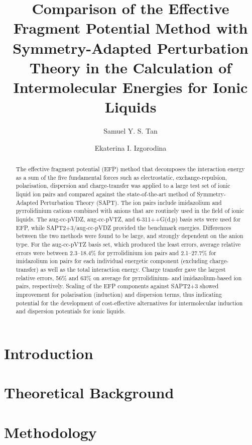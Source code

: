 \documentclass[journal=jctcce]{achemso}
\title{Comparison of the Effective Fragment Potential Method with Symmetry-Adapted Perturbation Theory in the Calculation of Intermolecular Energies for Ionic Liquids}
\author{Samuel Y. S. Tan}
\author{Ekaterina I. Izgorodina}
\affiliation[Monash University]
    {School of Chemistry, Monash University, 17 Rainforest Walk, Clayton, Victoria 3800, AUSTRALIA}
\newcommand{\enUnit}{kJ$ \cdot \text{mol}^{-1}$}
\newcommand{\ipair}[3]{
    \IfEqCase{#3} {
        {bfl} {\ensuremath{[ \text{C}_{\text{#2}}\text{#1}] [ \text{BF}_4 ]}}  
        {br} {\ensuremath{[ \text{C}_{\text{#2}}\text{#1}] [ \text{Br} ]}}
        {cl} {\ensuremath{[ \text{C}_{\text{#2}}\text{#1}] [ \text{Cl} ]}}
        {dca} {\ensuremath{[ \text{C}_{\text{#2}}\text{#1}] [ \text{Dca} ]}}
        {mes} {\ensuremath{[ \text{C}_{\text{#2}}\text{#1}] [ \text{Mes} ]}}
        {ntf} {\ensuremath{[ \text{C}_{\text{#2}}\text{#1}] [ \text{NTf}_{2} ]}} 
        {pf} {\ensuremath{[ \text{C}_{\text{#2}}\text{#1}] [ \text{PF}_6 ]}}
        {tos} {\ensuremath{[ \text{C}_{\text{#2}}\text{#1}] [ \text{Tos} ]}}   
    } 
    [ \PackageError{ipair}{Undefined option (anion) to ipair: #3}{} ]
}
\begin{document}
\maketitle

\begin{abstract}
    The effective fragment potential (EFP) method that decomposes the interaction energy as a sum of the five fundamental forces such as electrostatic, exchange-repulsion, polarisation, dispersion and charge-transfer was applied to a large test set of ionic liquid ion pairs and compared against the state-of-the-art method of Symmetry-Adapted Perturbation Theory (SAPT).
    The ion pairs include imidazolium and pyrrolidinium cations combined with anions that are routinely used in the field of ionic liquids.
    The aug-cc-pVDZ, aug-cc-pVTZ, and 6-311++G(d,p) basis sets were used for EFP, while SAPT2+3/aug-cc-pVDZ provided the benchmark energies.
    Differences between the two methods were found to be large, and strongly dependent on the anion type. 
    For the aug-cc-pVTZ basis set, which produced the least errors, average relative errors were between 2.3--18.4\% for pyrrolidinium ion pairs and 2.1--27.7\% for imidazolium ion pairs for each individual energetic component (excluding charge-transfer) as well as the total interaction energy.
    Charge transfer gave the largest relative errors, 56\% and 63\% on average for pyrrolidinium- and imidazolium-based ion pairs, respectively.
    Scaling of the EFP components against SAPT2+3 showed improvement for polarisation (induction) and dispersion terms, thus indicating potential for the development of cost-effective alternatives for intermolecular induction and dispersion potentials for ionic liquids. 
    
    
\end{abstract}

\section{Introduction}
\label{sec:intro}


\section{Theoretical Background}
\label{sec:bkgrd}


\section{Methodology}
\label{sec:method}

\end{document}
